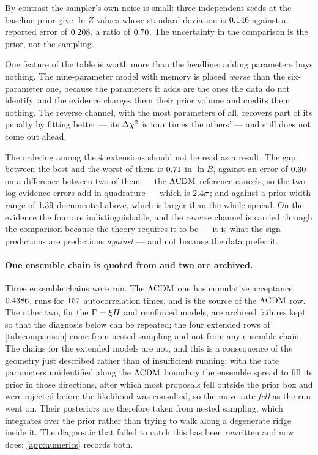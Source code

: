 By contrast the sampler's own noise is small: three independent seeds at the
baseline prior give $\ln Z$ values whose standard deviation is
$0.146$ against a reported error of
$0.208$, a ratio of
$0.70$. The uncertainty in the comparison
is the prior, not the sampling.

One feature of the table is worth more than the headline: adding parameters
buys nothing. The nine-parameter model with memory is placed \emph{worse}
than the six-parameter one, because the parameters it adds are the ones the
data do not identify, and the evidence charges them their prior volume and
credits them nothing. The reverse channel, with the most parameters of all,
recovers part of its penalty by fitting better --- its $\Delta\chi^{2}$ is four
times the others' --- and still does not come out ahead.

The ordering among the $4$ extensions should not be read
as a result. The gap between the best and the worst of them is
$0.71$ in $\ln B$, against an error of
$0.30$ on a difference between two of them --- the
$\Lambda\mathrm{CDM}$ reference cancels, so the two log-evidence errors add in quadrature
--- which is $2.4\sigma$; and against a prior-width range
of $1.39$ documented above, which is larger than the whole
spread. On the evidence the four are indistinguishable, and the reverse
channel is carried through the comparison because the theory requires it to be
--- it is what the sign predictions are predictions \emph{against} --- and not
because the data prefer it.

\paragraph{One ensemble chain is quoted from and two are archived.} Three
ensemble chains were run. The $\Lambda\mathrm{CDM}$ one has cumulative acceptance
$0.4386$, runs for
$157$ autocorrelation times, and is the source of
the $\Lambda\mathrm{CDM}$ row. The other two, for the $\Gamma=\xi H$ and reinforced
models, are archived failures kept so that the diagnosis below can be
repeated; the four extended rows of \cref{tab:comparison} come from nested
sampling and not from any ensemble chain. The chains for the extended models are
not, and this is a consequence of the geometry just described rather than of
insufficient running: with the rate parameters unidentified along the
$\Lambda\mathrm{CDM}$ boundary the ensemble spread to fill its prior in those directions,
after which most proposals fell outside the prior box and were rejected before
the likelihood was consulted, so the move rate \emph{fell} as the run went on.
Their posteriors are therefore taken from nested sampling, which integrates
over the prior rather than trying to walk along a degenerate ridge inside it.
The diagnostic that failed to catch this has been rewritten and now does;
\cref{app:numerics} records both.

